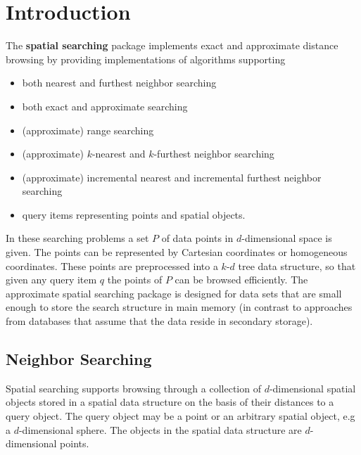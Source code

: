 

\section{Introduction}

The {\bf spatial searching} package implements
exact and approximate distance browsing
by providing implementations of algorithms supporting

\begin{itemize} 

\item
both nearest and furthest neighbor searching

\item
both exact and approximate searching

\item
(approximate) range searching

\item 
(approximate) $k$-nearest and $k$-furthest neighbor searching

\item 
(approximate) incremental nearest and incremental furthest neighbor searching

\item
query items representing points and spatial objects.

\end{itemize}

In these searching problems a set $P$ of data points in
$d$-dimensional space is given.  The points can be represented by
Cartesian coordinates or homogeneous coordinates.  These points are
preprocessed into a $k$-$d$ tree data structure, so that given any
query item $q$ the points of $P$ can be browsed efficiently.  The
approximate spatial searching package is designed for data sets that
are small enough to store the search structure in main memory (in
contrast to approaches from databases that assume that the data reside
in secondary storage).

\subsection{Neighbor Searching}

Spatial searching supports browsing through a collection of
$d$-dimensional spatial objects stored in a spatial data structure on
the basis of their distances to a query object. The query object may
be a point or an arbitrary spatial object, e.g a $d$-dimensional
sphere. The objects in the spatial data structure are $d$-dimensional
points.

